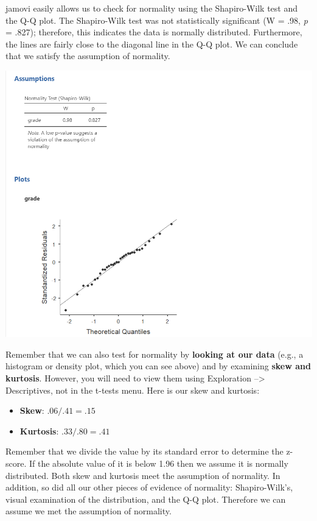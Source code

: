 \documentclass[
]{book}
\begin{document}
jamovi easily allows us to check for normality using the Shapiro-Wilk test and the Q-Q plot. The Shapiro-Wilk test was not statistically significant (W = .98, \emph{p} = .827); therefore, this indicates the data is normally distributed. Furthermore, the lines are fairly close to the diagonal line in the Q-Q plot. We can conclude that we satisfy the assumption of normality.

\includegraphics{images/02-independent_t-test/independent_t-test_normality.png}

Remember that we can also test for normality by \textbf{looking at our data} (e.g., a histogram or density plot, which you can see above) and by examining \textbf{skew and kurtosis}. However, you will need to view them using Exploration --\textgreater{} Descriptives, not in the t-tests menu. Here is our skew and kurtosis:

\begin{itemize}
\item
  \textbf{Skew}: \(.06/.41 = .15\)
\item
  \textbf{Kurtosis}: \(.33/.80 = .41\)
\end{itemize}

Remember that we divide the value by its standard error to determine the z-score. If the absolute value of it is below 1.96 then we assume it is normally distributed. Both skew and kurtosis meet the assumption of normality. In addition, so did all our other pieces of evidence of normality: Shapiro-Wilk's, visual examination of the distribution, and the Q-Q plot. Therefore we can assume we met the assumption of normality.
\end{document}

